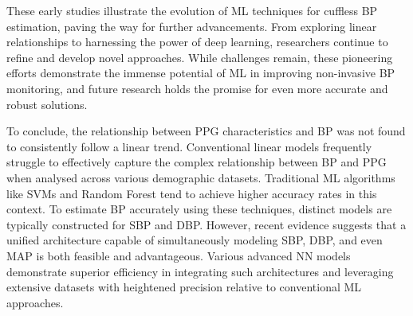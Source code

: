 These early studies illustrate the evolution of ML techniques for cuffless BP estimation, paving the way for further advancements.
From exploring linear relationships to harnessing the power of deep learning, researchers continue to refine and develop novel approaches.
While challenges remain, these pioneering efforts demonstrate the immense potential of ML in improving non-invasive BP monitoring, and future research holds the promise for even more accurate and robust solutions.

\vspace{0.2cm}

To conclude, the relationship between PPG characteristics and BP was not found to consistently follow a linear trend.
Conventional linear models frequently struggle to effectively capture the complex relationship between BP and PPG when analysed across various demographic datasets.
Traditional ML algorithms like SVMs and Random Forest tend to achieve higher accuracy rates in this context.
To estimate BP accurately using these techniques, distinct models are typically constructed for SBP and DBP\@.
However, recent evidence suggests that a unified architecture capable of simultaneously modeling SBP, DBP, and even MAP is both feasible and advantageous.
Various advanced NN models demonstrate superior efficiency in integrating such architectures and leveraging extensive datasets with heightened precision relative to conventional ML approaches.